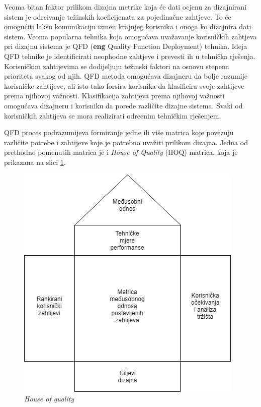 \documentclass[12pt]{article}
\begin{document}
Veoma bitan faktor prilikom dizajna metrike koja \'ce dati ocjenu za dizajnirani sistem je odre\dj ivanje te\v{z}inskih koeficijenata za pojedina\v{c}ne zahtjeve. To \'ce omogu\'citi lak\v{s}u komunikaciju izme\dj u krajnjeg korisnika i onoga ko dizajnira dati sistem. Veoma popularna tehnika koja omogu\'cava uva\v{z}avanje korisni\v{c}kih zahtjeva pri dizajnu sistema je QFD (\textbf{eng} Quality Function Deployment) tehnika. Ideja QFD tehnike je identificirati neophodne zahtjeve i prevesti ih u tehni\v{c}ka rje\v{s}enja. Korisni\v{c}kim zahtijevima se dodijeljuju te\v{z}inski faktori na osnovu stepena prioriteta svakog od njih. QFD metoda omogu\'cava dizajneru da bolje razumije korisni\v{c}ke zahtijeve, ali isto tako forsira korisnika da klasificira svoje zahtijeve prema njihovoj va\v{z}nosti. Klasifikacija zahtijeva prema njihovoj va\v{z}nosti omogu\'cava dizajneru i korisniku da porede razli\v{c}ite dizajne sistema. Svaki od korisni\v{c}kih zahtijeva se mora realizirati odre\dj enim tehni\v{c}kim rje\v{s}enjem. 

QFD proces podrazumijeva formiranje jedne ili vi\v{s}e matrica koje povezuju razli\v{c}ite potrebe i zahtijeve koje je potrebno uva\v{z}iti prilikom dizajna. Jedna od prethodno pomenutih matrica je i \textit{House of Quality} (HOQ) matrica, koja je prikazana na slici \ref{hoq}.  

\begin{figure}[!h]
\centering
\includegraphics[scale=0.7]{hoq}
\caption{\textit{House of quality}}
\label{hoq}
\end{figure}
 
\end{document}
